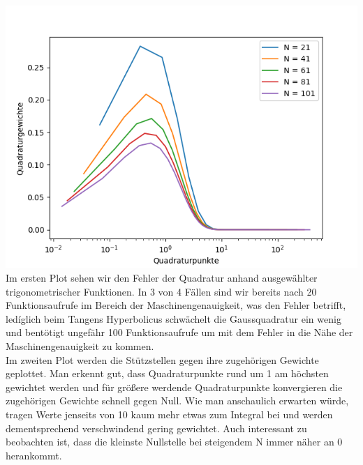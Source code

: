 \includegraphics[width=1.2\linewidth]{punkte-gewichte.png}
Im ersten Plot sehen wir den Fehler der Quadratur anhand ausgewählter trigonometrischer Funktionen. In 3 von 4 Fällen sind wir bereits nach 20 Funktionsaufrufe im Bereich der Maschinengenauigkeit, was den Fehler betrifft, ledíglich beim Tangens Hyperbolicus schwächelt die Gaussquadratur ein wenig und bentötigt ungefähr 100 Funktionsaufrufe um mit dem Fehler in die Nähe der Maschinengenauigkeit zu kommen.\\
Im zweiten Plot werden die Stützstellen gegen ihre zugehörigen Gewichte geplottet. Man erkennt gut, dass Quadraturpunkte rund um 1 am höchsten gewichtet werden und für größere werdende Quadraturpunkte konvergieren die zugehörigen Gewichte schnell gegen Null. Wie man anschaulich erwarten würde, tragen Werte jenseits von 10 kaum mehr etwas zum Integral bei und werden dementsprechend verschwindend gering gewichtet. Auch interessant zu beobachten ist, dass die kleinste Nullstelle bei steigendem N immer näher an 0 herankommt.
